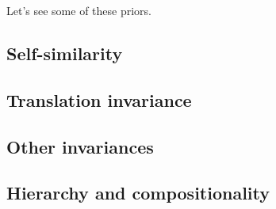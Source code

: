Let's see some of these priors. 

\clearpage
\subsection{Self-similarity} 


\subsection{Translation invariance} 


\subsection{Other invariances} 


\subsection{Hierarchy and compositionality} 

